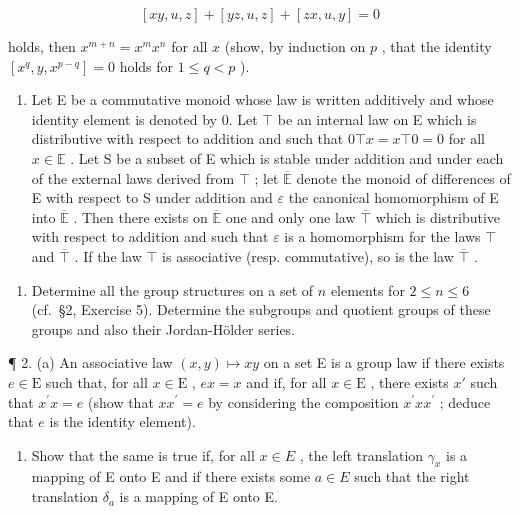 \[
[ x y, u, z ] + [ y z, u, z ] + [ z x, u, y ] = 0
\]

holds, then \(x^{m + n} = x^m x^n\) for all \(x\) (show, by induction on \(p\) , that the identity \([x^q, y, x^{p - q}] = 0\) holds for \(1 \leqslant q < p\) ).

\begin{enumerate}
\def\labelenumi{\arabic{enumi}.}
\setcounter{enumi}{9}
\tightlist
\item
  Let E be a commutative monoid whose law is written additively and whose identity element is denoted by 0. Let \(\top\) be an internal law on E which is distributive with respect to addition and such that \(0 \top x = x \top 0 = 0\) for all \(x \in \mathbb{E}\) . Let S be a subset of E which is stable under addition and under each of the external laws derived from \(\top\) ; let \(\overline{\mathbb{E}}\) denote the monoid of differences of E with respect to S under addition and \(\varepsilon\) the canonical homomorphism of E into \(\overline{\mathbb{E}}\) . Then there exists on \(\overline{\mathbb{E}}\) one and only one law \(\overline{\top}\) which is distributive with respect to addition and such that \(\varepsilon\) is a homomorphism for the laws \(\top\) and \(\overline{\top}\) . If the law \(\top\) is associative (resp. commutative), so is the law \(\overline{\top}\) .
\end{enumerate}

\BourbakiExercisesSection

\begin{enumerate}
\def\labelenumi{\arabic{enumi}.}
\tightlist
\item
  Determine all the group structures on a set of \(n\) elements for \(2 \leqslant n \leqslant 6\) (cf.~§2, Exercise 5). Determine the subgroups and quotient groups of these groups and also their Jordan-Hölder series.
\end{enumerate}

¶ 2. (a) An associative law \((x,y)\mapsto xy\) on a set E is a group law if there exists \(e\in\mathrm{E}\) such that, for all \(x\in\mathrm{E}\) , \(ex=x\) and if, for all \(x\in\mathrm{E}\) , there exists \(x'\) such that \(x^{\prime}x=e\) (show that \(xx^{\prime}=e\) by considering the composition \(x^{\prime}xx^{\prime}\) ; deduce that \(e\) is the identity element).

\begin{enumerate}
\def\labelenumi{(\alph{enumi})}
\setcounter{enumi}{1}
\tightlist
\item
  Show that the same is true if, for all \(x \in E\) , the left translation \(\gamma_{x}\) is a mapping of E onto E and if there exists some \(a \in E\) such that the right translation \(\delta_{a}\) is a mapping of E onto E.
\end{enumerate}


